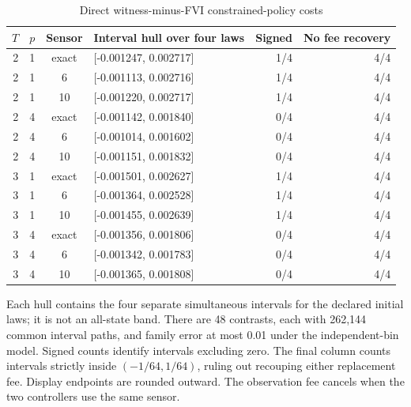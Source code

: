 \begin{table}[htbp]
\centering
\caption{Direct witness-minus-FVI constrained-policy costs}\label{tab:direct48}
\footnotesize
\begin{tabular}{rrclrr}
\toprule
$T$ & $p$ & Sensor & Interval hull over four laws & Signed & No fee recovery\\
\midrule
2 & 1 & exact & [-0.001247, 0.002717] & 1/4 & 4/4 \\
2 & 1 & 6 & [-0.001113, 0.002716] & 1/4 & 4/4 \\
2 & 1 & 10 & [-0.001220, 0.002717] & 1/4 & 4/4 \\
2 & 4 & exact & [-0.001142, 0.001840] & 0/4 & 4/4 \\
2 & 4 & 6 & [-0.001014, 0.001602] & 0/4 & 4/4 \\
2 & 4 & 10 & [-0.001151, 0.001832] & 0/4 & 4/4 \\
3 & 1 & exact & [-0.001501, 0.002627] & 1/4 & 4/4 \\
3 & 1 & 6 & [-0.001364, 0.002528] & 1/4 & 4/4 \\
3 & 1 & 10 & [-0.001455, 0.002639] & 1/4 & 4/4 \\
3 & 4 & exact & [-0.001356, 0.001806] & 0/4 & 4/4 \\
3 & 4 & 6 & [-0.001342, 0.001783] & 0/4 & 4/4 \\
3 & 4 & 10 & [-0.001365, 0.001808] & 0/4 & 4/4 \\
\bottomrule
\end{tabular}
\begin{minipage}{0.97\linewidth}\footnotesize\vspace{3pt}
Each hull contains the four separate simultaneous intervals for the declared initial laws; it is not an all-state band. There are 48 contrasts, each with 262,144 common interval paths, and family error at most 0.01 under the independent-bin model. Signed counts identify intervals excluding zero. The final column counts intervals strictly inside $(-1/64,1/64)$, ruling out recouping either replacement fee. Display endpoints are rounded outward. The observation fee cancels when the two controllers use the same sensor.
\end{minipage}
\end{table}
